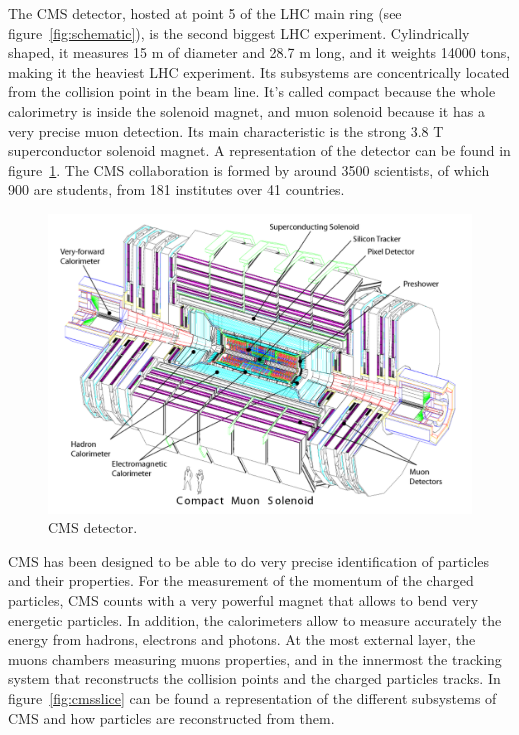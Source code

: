 The CMS detector, hosted at point 5 of the LHC main ring (see figure~\ref{fig:schematic}), is the second biggest LHC experiment. Cylindrically shaped, it measures 15 m of diameter and 28.7 m long, and it weights 14000 tons, making it the heaviest LHC experiment. Its subsystems are concentrically located from the collision point in the beam line. It's called compact because the whole calorimetry is inside the solenoid magnet, and muon solenoid because it has a very precise muon detection. Its main characteristic is the strong 3.8 T superconductor solenoid magnet. A representation of the detector can be found in figure~\ref{fig:cmsdet}. The CMS collaboration is formed by around 3500 scientists, of which 900 are students, from 181 institutes over 41 countries. 

\begin{figure}[!Hhtbp]
  \begin{center}
    \includegraphics[width=\textwidth]{figs/CMS_det.pdf}
    \caption{CMS detector.}
    \label{fig:cmsdet}
  \end{center}
\end{figure}

CMS has been designed to be able to do very precise identification of particles and their properties. For the measurement of the momentum of the charged particles, CMS counts with a very powerful magnet that allows to bend very energetic particles. In addition, the calorimeters allow to measure accurately the energy from hadrons, electrons and photons. At the most external layer, the muons chambers measuring muons properties, and in the innermost the tracking system that reconstructs the collision points and the charged particles tracks. In figure~\ref{fig:cmsslice} can be found a representation of the different subsystems of CMS and how particles are reconstructed from them.


